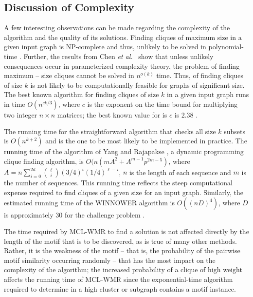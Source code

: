 
\subsection{Discussion of Complexity}

A few interesting observations can be made regarding the complexity of the algorithm and the quality of its solutions. Finding cliques of maximum size in a given input graph is NP-complete and thus, unlikely to be solved in polynomial-time \cite{GJ}. Further, the results from Chen {\em et al.}\ \cite{CHKX04} show that unless unlikely consequences occur in parameterized complexity theory, the problem of finding maximum -- size cliques cannot be solved in $n^{o(k)}$ time. Thus, of finding cliques of size $k$ is not likely to be computationally feasible for graphs of significant size.  The best known algorithm for finding cliques of size $k$ in a given input graph runs in time $O(n^{ck/3})$, where $c$ is the exponent on the time bound for multiplying two integer $n \times n$ matrices; the best known value for is $c$ is 2.38 \cite{N02}.  

The running time for the straightforward algorithm that checks all size $k$ subsets is $O(n^{k+2})$ and is the one to be most likely to be implemented in practice.   The running time of the algorithm of  Yang and Rajapakse \cite{YR04}, a dynamic programming clique finding algorithm, is $O(n(mA^2 + A^{m - 1} p^{2m - 5})$, where $A = n \sum^{2d}_{i = 0}{{\ell}\choose i}(3/4)^i(1/4)^{\ell - i}$, $n$ is the length of each sequence and $m$ is the number of sequences.  This running time reflects the steep computational expense required to find cliques of a given size for an input graph.  Similarly, the estimated running time of the WINNOWER algorithm is $O((n D)^4)$, where $D$ is approximately $30$ for the challenge problem \cite{PS00}.  
 
The time required by MCL-WMR to find a solution is not affected directly by the length of the motif that is to be discovered, as is true of many other methods.  Rather, it is the weakness of the motif -- that is, the probability of the pairwise motif similarity occurring randomly -- that has the most impact on the complexity of the algorithm; the increased probability of a clique of high weight affects the running time of MCL-WMR since the exponential-time algorithm required to determine in a high cluster or subgraph contains a motif instance. 

